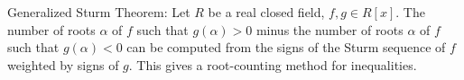 Generalized Sturm Theorem: Let $R$ be a real closed field, $f, g \in R[x]$. The number of roots $\alpha$ of $f$ such that $g(\alpha) > 0$ minus the number of roots $\alpha$ of $f$ such that $g(\alpha) < 0$ can be computed from the signs of the Sturm sequence of $f$ weighted by signs of $g$. This gives a root-counting method for inequalities.
